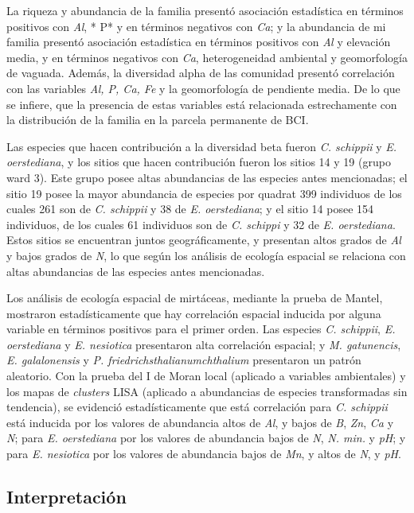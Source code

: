 \documentclass[11pt,]{article}
\begin{document}
La riqueza y abundancia de la familia presentó asociación estadística en
términos positivos con \emph{Al}, * P* y en términos negativos con
\emph{Ca}; y la abundancia de mi familia presentó asociación estadística
en términos positivos con \emph{Al} y elevación media, y en términos
negativos con \emph{Ca}, heterogeneidad ambiental y geomorfología de
vaguada. Además, la diversidad alpha de las comunidad presentó
correlación con las variables \emph{Al, P, Ca, Fe} y la geomorfología de
pendiente media. De lo que se infiere, que la presencia de estas
variables está relacionada estrechamente con la distribución de la
familia en la parcela permanente de BCI.

Las especies que hacen contribución a la diversidad beta fueron \emph{C.
schippii} y \emph{E. oerstediana}, y los sitios que hacen contribución
fueron los sitios 14 y 19 (grupo ward 3). Este grupo posee altas
abundancias de las especies antes mencionadas; el sitio 19 posee la
mayor abundancia de especies por quadrat 399 individuos de los cuales
261 son de \emph{C. schippii} y 38 de \emph{E. oerstediana}; y el sitio
14 posee 154 individuos, de los cuales 61 individuos son de \emph{C.
schippi} y 32 de \emph{E. oerstediana}. Estos sitios se encuentran
juntos geográficamente, y presentan altos grados de \emph{Al} y bajos
grados de \emph{N}, lo que según los análisis de ecología espacial se
relaciona con altas abundancias de las especies antes mencionadas.

Los análisis de ecología espacial de mirtáceas, mediante la prueba de
Mantel, mostraron estadísticamente que hay correlación espacial inducida
por alguna variable en términos positivos para el primer orden. Las
especies \emph{C. schippii}, \emph{E. oerstediana} y \emph{E. nesiotica}
presentaron alta correlación espacial; y \emph{M. gatunencis}, \emph{E.
galalonensis} y \emph{P. friedrichsthalianumchthalium} presentaron un
patrón aleatorio. Con la prueba del I de Moran local (aplicado a
variables ambientales) y los mapas de \emph{clusters} LISA (aplicado a
abundancias de especies transformadas sin tendencia), se evidenció
estadísticamente que está correlación para \emph{C. schippii} está
inducida por los valores de abundancia altos de \emph{Al}, y bajos de
\emph{B}, \emph{Zn}, \emph{Ca} y \emph{N}; para \emph{E. oerstediana}
por los valores de abundancia bajos de \emph{N}, \emph{N. min.} y
\emph{pH}; y para \emph{E. nesiotica} por los valores de abundancia
bajos de \emph{Mn}, y altos de \emph{N}, y \emph{pH}.

\subsection{Interpretación}\label{interpretaciuxf3n}
\end{document}
